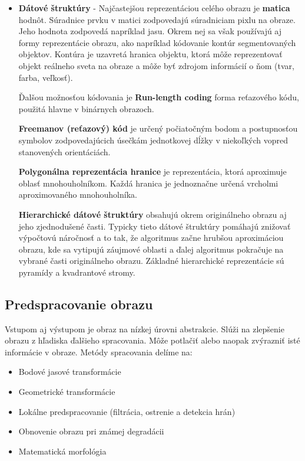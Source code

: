 \begin{itemize}
\item \textbf{Dátové štruktúry} - Najčastejšou reprezentáciou celého obrazu je \textbf{matica} hodnôt. Súradnice prvku v matici zodpovedajú súradniciam pixlu na obraze. Jeho hodnota zodpovedá napríklad jasu.  Okrem nej sa však používajú aj formy reprezentácie obrazu, ako napríklad kódovanie kontúr segmentovaných objektov. Kontúra je uzavretá hranica objektu, ktorá môže reprezentovať objekt reálneho sveta na obraze a môže byť zdrojom informácií o ňom (tvar, farba, veľkosť). \cite{Analysis_and_Machine_Vision}

Ďalšou možnosťou kódovania je \textbf{Run-length coding} forma reťazového kódu, použitá hlavne v binárnych obrazoch. 

\textbf{Freemanov (reťazový) kód} je určený počiatočným bodom a postupnosťou symbolov zodpovedajúcich úsečkám jednotkovej dĺžky v niekoľkých vopred stanovených orientáciách. \cite{Analysis_and_Machine_Vision} 

\textbf{Polygonálna reprezentácia hranice} je reprezentácia, ktorá aproximuje oblasť mnohouholníkom. Každá hranica je jednoznačne určená vrcholmi aproximovaného mnohouholníka. \cite{Analysis_and_Machine_Vision}

\textbf{Hierarchické dátové štruktúry} obsahujú okrem originálneho obrazu aj jeho zjednodušené časti. Typicky tieto dátové štruktúry pomáhajú znižovať výpočtovú náročnosť a to tak, že algoritmus začne hrubšou aproximáciou obrazu, kde sa vytipujú záujmové oblasti a ďalej algoritmus pokračuje na vybrané časti originálneho obrazu. Základné hierarchické reprezentácie sú pyramídy a kvadrantové stromy. \cite{Analysis_and_Machine_Vision} 

\end{itemize}



\subsection{Predspracovanie obrazu}
Vstupom aj výstupom je obraz na nízkej úrovni abstrakcie. Slúži na zlepšenie obrazu z hľadiska ďalšieho spracovania. Môže potlačiť alebo naopak zvýrazniť isté informácie v obraze. Metódy spracovania delíme na: \cite{pocitacove_videnie_v_praxi}
\begin{itemize}
\item Bodové jasové transformácie
\item Geometrické transformácie
\item Lokálne predspracovanie (filtrácia, ostrenie a detekcia hrán)
\item Obnovenie obrazu pri známej degradácii 
\item Matematická morfológia 
\end{itemize}

